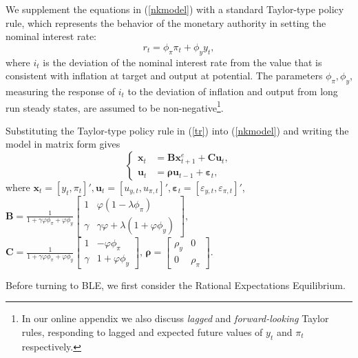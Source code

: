 We supplement the equations in (\ref{nkmodel}) with a standard Taylor-type policy rule, which represents the behavior of the monetary authority in setting the nominal interest rate:
\begin{equation}\label{tr}
     r_t=\phi_\pi\pi_t+\phi_y y_t,
\end{equation}
where $i_t$ is the deviation of the nominal interest rate from the value that is consistent with inflation at target and output at potential. The parameters $\phi_\pi, \phi_y$, measuring the response of $i_t$ to the deviation of inflation and output from long run steady states, are assumed to be non-negative\footnote{In our online appendix we also discuss {\it lagged} and {\it forward-looking} Taylor rules, responding to lagged and expected future values of $y_t$ and $\pi_t$ respectively.}. 

Substituting the Taylor-type policy rule in (\ref{tr}) into (\ref{nkmodel}) and writing the model in matrix form gives
\begin{equation}\label{nkmodelm}
    \left\{
    \begin{split}
          {\pmb x}_t&={\pmb B} {\pmb x}_{t+1}^e+{\pmb C}\pmb{u}_t,\\
          \pmb{u}_t&={\pmb\rho}\pmb{u}_{t-1}+\pmb{\varepsilon}_t,
    \end{split}
    \right.
\end{equation}
where ${\pmb x}_t=[y_t, \pi_t]', {\pmb u}_t=[u_{y,t}, u_{\pi,t}]',
{\pmb\varepsilon}_t=[\varepsilon_{y,t}, \varepsilon_{\pi,t}]'$, ${\pmb
B}=\frac{1}{1+\gamma\varphi\phi_\pi+\varphi\phi_y}\left[\begin{array}{cc}
1&\varphi(1-\lambda\phi_\pi)\\
\gamma&\gamma\varphi+\lambda(1+\varphi\phi_y)
\end{array}\right],$
${\pmb
C}=\frac{1}{1+\gamma\varphi\phi_\pi+\varphi\phi_y}\left[\begin{array}{cc}
1&-\varphi\phi_\pi\\
\gamma&1+\varphi\phi_y
\end{array}\right],\,{\pmb
\rho}=\left[\begin{array}{cc}
\rho_y&0\\
0&\rho_{\pi}
\end{array}\right].$

Before turning to BLE, we first consider the Rational Expectations Equilibrium. 

